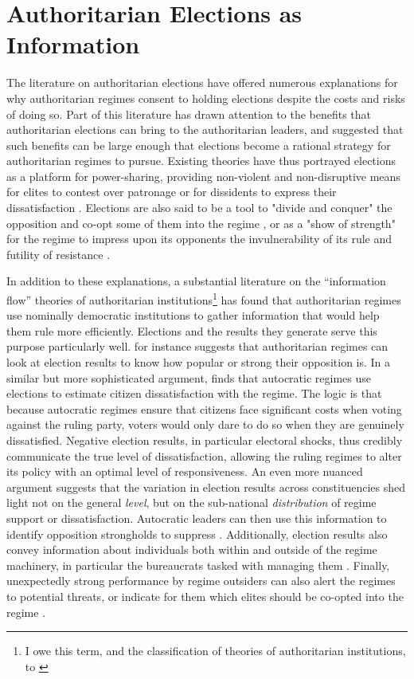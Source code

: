 \documentclass[12pt]{article}\usepackage[]{graphicx}\usepackage[]{color}
\newcommand{\1}{\mathbbm{1}}
\begin{document}
\section{Authoritarian Elections as Information}
\label{sec:info}
The literature on authoritarian elections have offered numerous explanations for why authoritarian regimes consent to holding elections despite the costs and risks of doing so. Part of this literature has drawn attention to the benefits that authoritarian elections can bring to the authoritarian leaders, and suggested that such benefits can be large enough that elections become a rational strategy for authoritarian regimes to pursue. Existing theories have thus portrayed elections as a platform for power-sharing, providing non-violent and non-disruptive means for elites to contest over patronage \citep{LustOkar2006} or for dissidents to express their dissatisfaction \citep{AR2005}. Elections are also said to be a tool to "divide and conquer" the opposition and co-opt some of them into the regime \citep{LustOkar2005}, or as a "show of strength" for the regime to impress upon its opponents the invulnerability of its rule and futility of resistance \citep{Geddes2005}. 

In addition to these explanations, a substantial literature on the ``information flow'' theories of authoritarian institutions\footnote{I owe this term, and the classification of theories of authoritarian institutions, to \cite{Hou2017}} has found that authoritarian regimes use nominally democratic institutions to gather information that would help them rule more efficiently. Elections and the results they generate serve this purpose particularly well. \cite{Geddes2005} for instance suggests that authoritarian regimes can look at election results to know how popular or strong their opposition is. In a similar but more sophisticated argument, \cite{Miller2015} finds that autocratic regimes use elections to estimate citizen dissatisfaction with the regime. The logic is that because autocratic regimes ensure that citizens face significant costs when voting against the ruling party, voters would only dare to do so when they are genuinely dissatisfied. Negative election results, in particular electoral shocks, thus credibly communicate the true level of dissatisfaction, allowing the ruling regimes to alter its policy with an optimal level of responsiveness. An even more nuanced argument suggests that the variation in election results across constituencies shed light not on the general \textit{level}, but on the sub-national \textit{distribution} of regime support or dissatisfaction. Autocratic leaders can then use this information to identify opposition strongholds to suppress \citep{Magaloni2006, Blaydes2008}. Additionally, election results also convey information about individuals both within and outside of the regime machinery, in particular the bureaucrats tasked with managing them \citep{Magaloni2006, Blaydes2008}. Finally, unexpectedly strong performance by regime outsiders can also alert the regimes to potential threats, or indicate for them which elites should be co-opted into the regime \cite{LustOkar2005}.
\end{document}
